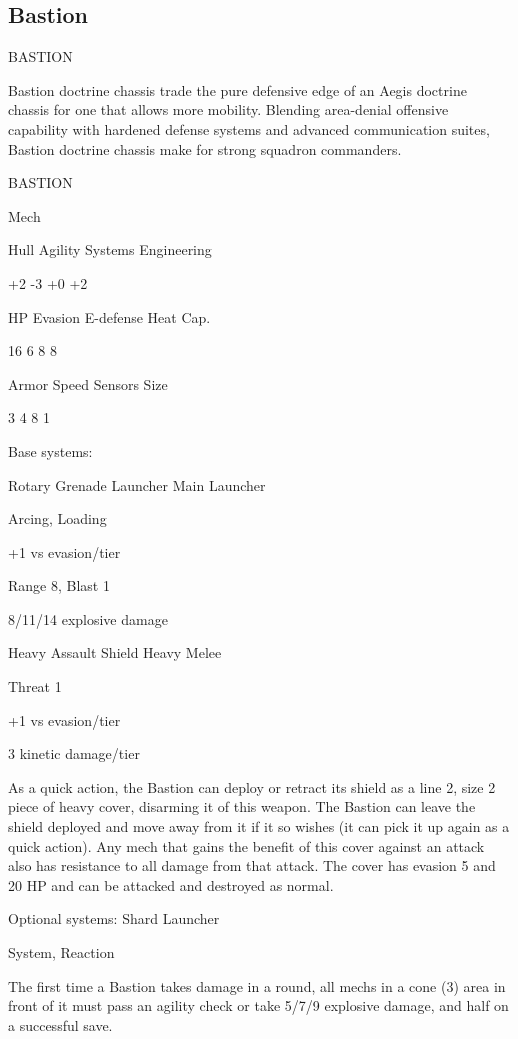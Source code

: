 \subsection{Bastion}

                                               BASTION

Bastion doctrine chassis trade the pure defensive edge of an Aegis doctrine chassis for one that
allows more mobility. Blending area-denial offensive capability with hardened defense systems
and advanced communication suites, Bastion doctrine chassis make for strong squadron
commanders.

 BASTION

 Mech

 Hull       Agility     Systems       Engineering

 +2         -3          +0            +2

 HP         Evasion      E-defense    Heat Cap.

 16         6           8             8

 Armor      Speed       Sensors       Size

 3          4           8             1

Base systems:

Rotary Grenade Launcher
Main Launcher

Arcing, Loading

+1 vs evasion/tier

Range 8, Blast 1

8/11/14 explosive damage


Heavy Assault Shield
Heavy Melee

Threat 1

+1 vs evasion/tier

3 kinetic damage/tier

As a quick action, the Bastion can deploy or retract its shield as a line 2, size 2 piece of heavy
cover, disarming it of this weapon. The Bastion can leave the shield deployed and move away
from it if it so wishes (it can pick it up again as a quick action). Any mech that gains the benefit of
this cover against an attack also has resistance to all damage from that attack. The cover has
evasion 5 and 20 HP and can be attacked and destroyed as normal.


Optional systems:
Shard Launcher

System, Reaction





The first time a Bastion takes damage in a round, all mechs in a cone (3) area in front of it must
pass an agility check or take 5/7/9 explosive damage, and half on a successful save.


